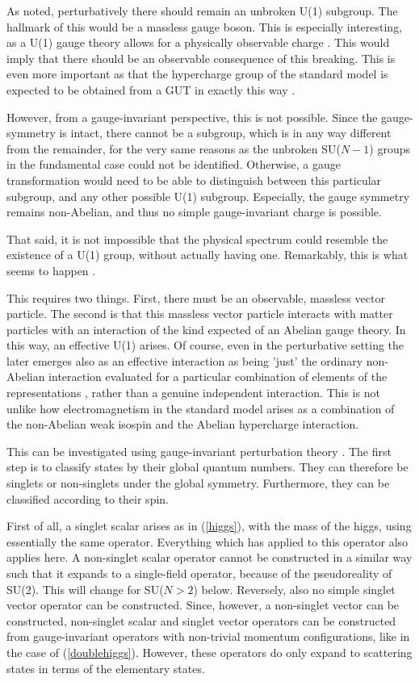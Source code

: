 \documentclass[final,twoside,12pt]{article}
\newcommand*{\pref}[1]{(\ref{#1})}
\newcommand*{\1}{1\!\!\!\bot}
\begin{document}
As noted, perturbatively there should remain an unbroken U(1) subgroup. The hallmark of this would be a massless gauge boson. This is especially interesting, as a U(1) gauge theory allows for a physically observable charge \cite{Haag:1992hx}. This would imply that there should be an observable consequence of this breaking. This is even more important as that the hypercharge group of the standard model is expected to be obtained from a GUT in exactly this way \cite{Bohm:2001yx,Langacker:1980js}.

However, from a gauge-invariant perspective, this is not possible. Since the gauge-symmetry is intact, there cannot be a subgroup, which is in any way different from the remainder, for the very same reasons as the unbroken SU($N-1$) groups in the fundamental case could not be identified. Otherwise, a gauge transformation would need to be able to distinguish between this particular subgroup, and any other possible U(1) subgroup. Especially, the gauge symmetry remains non-Abelian, and thus no simple gauge-invariant charge is possible.

That said, it is not impossible that the physical spectrum could resemble the existence of a U(1) group, without actually having one. Remarkably, this is what seems to happen \cite{Maas:2017xzh}.

This requires two things. First, there must be an observable, massless vector particle. The second is that this massless vector particle interacts with matter particles with an interaction of the kind expected of an Abelian gauge theory. In this way, an effective U(1) arises. Of course, even in the perturbative setting the later emerges also as an effective interaction as being 'just' the ordinary non-Abelian interaction evaluated for a particular combination of elements of the representations \cite{Bohm:2001yx}, rather than a genuine independent interaction. This is not unlike how electromagnetism in the standard model arises as a combination of the non-Abelian weak isospin and the Abelian hypercharge interaction.

This can be investigated using gauge-invariant perturbation theory \cite{Kondo:2016ywd,Maas:2017xzh}. The first step is to classify states by their global quantum numbers. They can therefore be singlets or non-singlets under the global symmetry. Furthermore, they can be classified according to their spin.

First of all, a singlet scalar arises as in \pref{higgs}, with the mass of the higgs, using essentially the same operator. Everything which has applied to this operator also applies here. A non-singlet scalar operator cannot be constructed in a similar way such that it expands to a single-field operator, because of the pseudoreality of SU(2). This will change for SU($N>2$) below. Reversely, also no simple singlet vector operator can be constructed. Since, however, a non-singlet vector can be constructed, non-singlet scalar and singlet vector operators can be constructed from gauge-invariant operators with non-trivial momentum configurations, like in the case of \pref{doublehiggs}. However, these operators do only expand to scattering states in terms of the elementary states.
\end{document}
